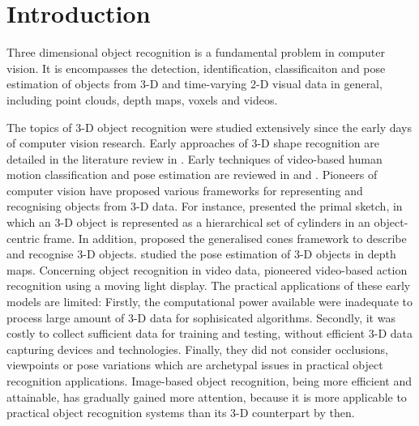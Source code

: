 \chapter{Introduction}
\label{chap/intro} 

Three dimensional object recognition is a fundamental problem in computer vision. It is encompasses the detection, identification, classificaiton and pose estimation of objects from 3-D and time-varying 2-D visual data in general, including point clouds, depth maps, voxels and videos. 

The topics of 3-D object recognition were studied extensively since the early days of computer vision research. Early approaches of 3-D shape recognition are detailed in the literature review in \cite{Besl1985}. Early techniques of video-based human motion classification and pose estimation are reviewed in \cite{Cedras1995} and \cite{Aggarwal1999}. 
Pioneers of computer vision have proposed various frameworks for representing and recognising objects from 3-D data.
For instance, \cite{Marr1978} presented the primal sketch, in which an 3-D object is represented as a hierarchical set of cylinders in an object-centric frame. 
In addition, \cite{Nevatia1977} proposed the generalised cones framework to describe and recognise 3-D objects. \cite{Bolles1983} studied the pose estimation of 3-D objects in depth maps.
Concerning object recognition in video data, \cite{Johansson1973} pioneered video-based action recognition using a moving light display. 
The practical applications of these early models are limited: Firstly, the computational power available were inadequate to process large amount of 3-D data for sophisicated algorithms. Secondly, it was costly to collect sufficient data for training and testing, without efficient 3-D data capturing devices and technologies. Finally, they did not consider occlusions, viewpoints or pose variations which are archetypal issues in practical object recognition applications. Image-based object recognition, being more efficient and attainable, has gradually gained more attention, because it is more applicable to practical object recognition systems than its 3-D counterpart by then.   

